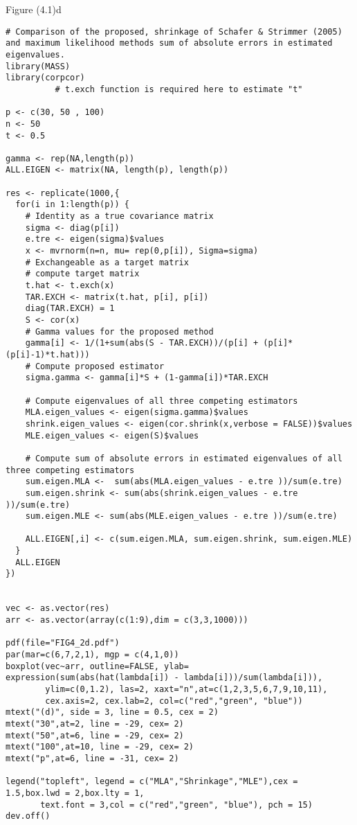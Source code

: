 Figure (4.1)d
\begin{lstlisting}
# Comparison of the proposed, shrinkage of Schafer & Strimmer (2005) and maximum likelihood methods sum of absolute errors in estimated eigenvalues.
library(MASS)
library(corpcor)
          # t.exch function is required here to estimate "t"

p <- c(30, 50 , 100)
n <- 50
t <- 0.5

gamma <- rep(NA,length(p))
ALL.EIGEN <- matrix(NA, length(p), length(p))

res <- replicate(1000,{
  for(i in 1:length(p)) {
    # Identity as a true covariance matrix
    sigma <- diag(p[i])
    e.tre <- eigen(sigma)$values
    x <- mvrnorm(n=n, mu= rep(0,p[i]), Sigma=sigma)
    # Exchangeable as a target matrix
    # compute target matrix
    t.hat <- t.exch(x)
    TAR.EXCH <- matrix(t.hat, p[i], p[i])
    diag(TAR.EXCH) = 1
    S <- cor(x)
    # Gamma values for the proposed method
    gamma[i] <- 1/(1+sum(abs(S - TAR.EXCH))/(p[i] + (p[i]*(p[i]-1)*t.hat)))
    # Compute proposed estimator
    sigma.gamma <- gamma[i]*S + (1-gamma[i])*TAR.EXCH
    
    # Compute eigenvalues of all three competing estimators
    MLA.eigen_values <- eigen(sigma.gamma)$values
    shrink.eigen_values <- eigen(cor.shrink(x,verbose = FALSE))$values
    MLE.eigen_values <- eigen(S)$values
    
    # Compute sum of absolute errors in estimated eigenvalues of all three competing estimators
    sum.eigen.MLA <-  sum(abs(MLA.eigen_values - e.tre ))/sum(e.tre)
    sum.eigen.shrink <- sum(abs(shrink.eigen_values - e.tre ))/sum(e.tre)
    sum.eigen.MLE <- sum(abs(MLE.eigen_values - e.tre ))/sum(e.tre)
    
    ALL.EIGEN[,i] <- c(sum.eigen.MLA, sum.eigen.shrink, sum.eigen.MLE)
  }
  ALL.EIGEN
})


vec <- as.vector(res)
arr <- as.vector(array(c(1:9),dim = c(3,3,1000)))

pdf(file="FIG4_2d.pdf")
par(mar=c(6,7,2,1), mgp = c(4,1,0))
boxplot(vec~arr, outline=FALSE, ylab= expression(sum(abs(hat(lambda[i]) - lambda[i]))/sum(lambda[i])),
        ylim=c(0,1.2), las=2, xaxt="n",at=c(1,2,3,5,6,7,9,10,11),
        cex.axis=2, cex.lab=2, col=c("red","green", "blue"))
mtext("(d)", side = 3, line = 0.5, cex = 2)
mtext("30",at=2, line = -29, cex= 2)
mtext("50",at=6, line = -29, cex= 2)
mtext("100",at=10, line = -29, cex= 2)
mtext("p",at=6, line = -31, cex= 2)

legend("topleft", legend = c("MLA","Shrinkage","MLE"),cex = 1.5,box.lwd = 2,box.lty = 1,
       text.font = 3,col = c("red","green", "blue"), pch = 15)
dev.off()
\end{lstlisting}

